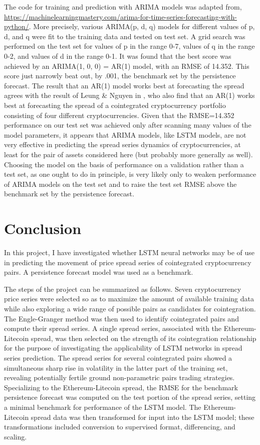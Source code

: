 \documentclass{article}
\begin{document}
The code for training and prediction with ARIMA models was adapted from, \noindent \url{https://machinelearningmastery.com/arima-for-time-series-forecasting-with-python/}. More precisely, various ARIMA(p, d, q) models for different values of p, d, and q were fit to the training data and tested on test set. A grid search was performed on the test set for values of p in the range 0-7, values of q in the range 0-2, and values of d in the range 0-1. It was found that the best score was achieved by an ARIMA(1, 0, 0) = AR(1) model, with an RMSE of 14.352. This score just narrowly beat out, by .001, the benchmark set by the persistence forecast. The result that an AR(1) model works best at forecasting the spread agrees with the result of Leung \& Nguyen in \cite{leung2018constructing}, who also find that an AR(1) works best at forecasting the spread of a cointegrated cryptocurrency portfolio consisting of four different cryptocurrencies. Given that the RMSE=14.352 performance on our test set was achieved only after scanning many values of the model parameters, it appears that ARIMA models, like LSTM models, are not very effective in predicting the spread series dynamics of cryptocurrencies, at least for the pair of assets considered here (but probably more generally as well). Choosing the model on the basis of performance on a validation rather than a test set, as one ought to do in principle, is very likely only to weaken performance of ARIMA models on the test set and to raise the test set RMSE above the benchmark set by the persistence forecast. 


\section{Conclusion}

In this project, I have investigated whether LSTM neural networks may be of use in predicting the movement of price spread series of cointegrated cryptocurrency pairs. A persistence forecast model was used as a benchmark. 

The steps of the project can be summarized as follows. Seven cryptocurrency price series were selected so as to maximize the amount of available training data while also exploring a wide range of possible pairs as candidates for cointegration. The Engle-Granger method was then used to identify cointegrated pairs and compute their spread series. A single spread series, associated with the Ethereum-Litecoin spread, was then selected on the strength of its cointegration relationship for the purpose of investigating the applicability of LSTM networks in spread series prediction. The spread series for several cointegrated pairs showed a simultaneous sharp rise in volatility  in the latter part of the training set, revealing potentially fertile ground non-parametric pairs trading strategies. Specializing to the Ethereum-Litecoin spread, the RMSE for the benchmark persistence forecast was computed on the test portion of the spread series, setting a minimal benchmark for performance of the LSTM model. The Ethereum-Litecoin spread data was then transformed for input into the LSTM model; these transformations included conversion to supervised format, differencing, and scaling. 
\end{document}
